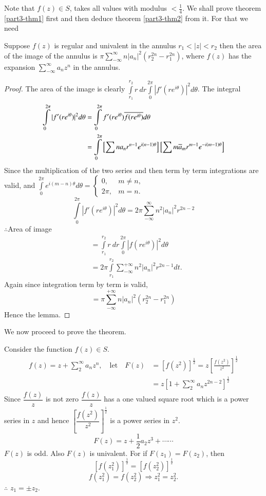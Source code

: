 Note that $f(z)\in S$, takes all values with modulus
$<\frac{1}{4}$. We shall prove theorem \ref{part3-thm1} first and then
deduce theorem \ref{part3-thm2} from it. For that we need

\setcounter{lem}{0}
\begin{lem}\label{part3-lem1}
Suppose $f(z)$ is regular and univalent in the annulus
$r_{1}<|z|<r_{2}$ then the area of the image of the annulus is
$\pi\sum\limits^{\infty}_{-\infty}n|a_{n}|^{2}(r^{2n}_{2}-r^{2n}_{1})$,
where $f(z)$ has the expansion
$\sum\limits^{\infty}_{-\infty}a_{n}z^{n}$ in the annulus.
\end{lem}

\begin{proof}
The area of the image is clearly $\int\limits^{r_{2}}_{r_{1}}r\ dr
\int\limits^{2\pi}_{0}|f'(re^{i\theta})|^{2}d\theta$. The integral
\begin{align*}
\int\limits^{2\pi}_{0}|f'(re^{i\theta})|^{2}d\theta &=
\int\limits^{2\pi}_{0}f'(re^{i\theta})\overline{f(re^{i\theta})}d\theta\\
&=\int\limits^{2\pi}_{0}\left[\sum
  na_{n}r^{n-1}e^{i(n-1)\theta}\right]\left[\sum
  m\overline{a}_{m}r^{m-1}e^{-i(m-1)\theta}\right]   
\end{align*}
Since the multiplication of the two series and then term by term
integrations are valid, and
$
\int\limits^{2\pi}_{0}e^{i(m-n)\theta}d\theta= \begin{cases}
0, & m\neq n,\\
2\pi,& m=n.
\end{cases}
$
$$
\int\limits^{2\pi}_{0}|f'(re^{i\theta})|^{2}d\theta=2\pi\sum^{\infty}_{-\infty}n^{2}|a_{n}|^{2}r^{2n-2}
$$
$\therefore$\pageoriginale Area of image
\begin{align*}
&=
  \int\limits^{r_{2}}_{r_{1}}r\ dr\int\limits^{2\pi}_{0}|f(re^{i\theta})|^{2}d\theta\\
&= 2\pi \int\limits^{r_{2}}_{r_{1}}\sum^{+\infty}_{-\infty}n^{2}|a_{n}|^{2}r^{2n-1}dt.
\end{align*}
Again since integration term by term is valid,
$$
=\pi\sum^{+\infty}_{-\infty}n|a_{n}|^{2}(r^{2n}_{2}-r^{2n}_{1})
$$
Hence the lemma.
\end{proof}

We now proceed to prove the theorem.

Consider the function $f(z)\in S$.
\begin{align*}
f(z)=z+\sum^{\infty}_{2}a_{n}z^{n},\quad\text{let}\quad F(z) &=
\left[f(z^{2})\right]^{\frac{1}{2}}=z\left[\frac{f(z^{2})}{z^{2}}\right]^{\frac{1}{2}}\\
&= z\left[1+\sum^{\infty}_{2}a_{n}z^{2n-2}\right]^{\frac{1}{2}}
\end{align*}
Since $\dfrac{f(z)}{z}$ is not zero $\dfrac{f(z)}{z}$ has a one valued
square root which is a power series in $z$ and hence
$\left[\dfrac{f(z^{2})}{z^{2}}\right]^{\frac{1}{2}}$ is a power series
in $z^{2}$.
$$
F(z)=z+\frac{1}{2}a_{2}z^{3}+\cdots\cdots
$$
$F(z)$ is odd. Also $F(z)$ is univalent. For if $F(z_{1})=F(z_{2})$,
then 
$$
\left[f(z^{2}_{1})\right]^{\frac{1}{2}}=\left[f(z^{2}_{2})\right]^{\frac{1}{2}}
$$\pageoriginale 
\iec
$$
f(z^{2}_{1})=f(z^{2}_{2})\Longrightarrow z^{2}_{1}=z^{2}_{2}.
$$
$\therefore$ $z_{1}=\pm z_{2}$.

